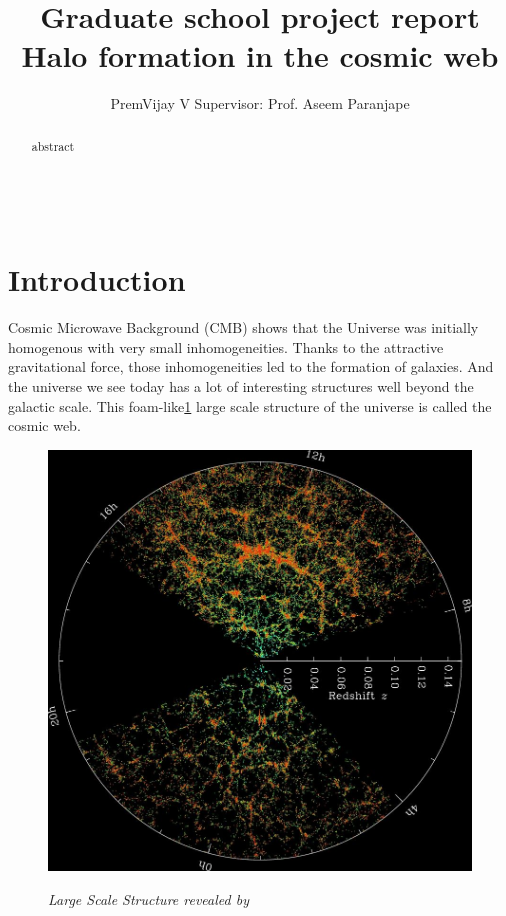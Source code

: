 \documentclass[12pt]{article}
\title{Graduate school project report\\
	Halo formation in the cosmic web}
\author{ PremVijay V \qquad Supervisor: Prof. Aseem Paranjape}
\begin{document}
\maketitle


\begin{abstract}
abstract\\
\\
\\
\\

\end{abstract}

\section{Introduction}
Cosmic Microwave Background (CMB) shows that the Universe was initially homogenous with very small inhomogeneities. Thanks to the attractive gravitational force, those inhomogeneities led to the formation of galaxies. And the universe we see today has a lot of interesting structures well beyond the galactic scale. This foam-like\ref{fig:orangepie} large scale structure of the universe is called the cosmic web. 

\begin{figure}
\hfill \caption{ \textit{Large Scale Structure revealed by \cite{cite_sdss}}}
\hfill \includegraphics[width=0.94\linewidth]{orangepie}
\label{fig:orangepie}
\end{figure}
\end{document}
